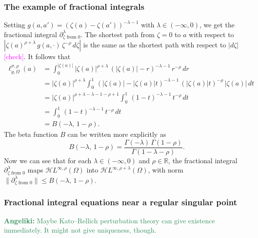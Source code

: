 \documentclass{article}
\newcommand{\R}{\mathbb{R}}
\newcommand{\holoL}[1]{\mathcal{H}L^{#1}} %
\begin{document}
\subsubsection{The example of fractional integrals}
Setting $g(a, a') = (\zeta(a) - \zeta(a'))^{-\lambda-1}$ with $\lambda \in (-\infty, 0)$, we get the fractional integral $\partial^\lambda_{\zeta \text{ from } 0}$. The shortest path from $\zeta = 0$ to $a$ with respect to $|\zeta(a)^{\rho+\lambda}\,g(a, \cdot)\,\zeta^{-\rho}\,d\zeta|$ is the same as the shortest path with respect to $|d\zeta|$ \textcolor{magenta}{[check]}. It follows that
\begin{align*}
\ell^{\sigma, \rho}_{g, \Omega}(a) & = \int_0^{|\zeta(a)|} |\zeta(a)|^{\rho+\lambda}\,(|\zeta(a)| - r)^{-\lambda-1}\,r^{-\rho}\,dr \\
& = |\zeta(a)|^{\rho+\lambda} \int_0^1 \,(|\zeta(a)| - |\zeta(a)| t)^{-\lambda-1}\,(|\zeta(a)| t)^{-\rho}\,|\zeta(a)|\,dt \\
& = |\zeta(a)|^{\rho+\lambda-\lambda-1-\rho+1} \int_0^1 \,(1-t)^{-\lambda-1}\,t^{-\rho}\,dt \\
& = \int_0^1 \,(1-t)^{-\lambda-1}\,t^{-\rho}\,dt \\
& = B(-\lambda,\,1-\rho).
\end{align*}
The beta function $B$ can be written more explicitly as
\[ B(-\lambda,\,1-\rho) = \frac{\Gamma(-\lambda)\,\Gamma(1-\rho)}{\Gamma(1-\lambda-\rho)}. \]
Now we can see that for each $\lambda \in (-\infty, 0)$ and $\rho \in \R$, the fractional integral $\partial^\lambda_{\zeta \text{ from } 0}$ maps $\holoL{\infty, \rho}(\Omega)$ into $\holoL{\infty, \rho+\lambda}(\Omega)$, with norm $\|\partial^\lambda_{\zeta \text{ from } 0}\| \le B(-\lambda,\,1-\rho)$.
\subsubsection{Fractional integral equations near a regular singular point}\label{frac_int_exist}
\textcolor{SeaGreen}{\textbf{Angeliki:} Maybe Kato--Rellich perturbation theory can give existence immediately. It might not give uniqueness, though.}
\end{document}
